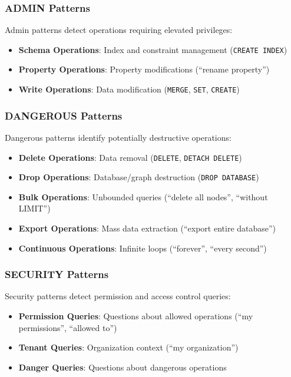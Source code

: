 \documentclass[a4paper,twoside]{sapthesis}
\begin{document}
\subsubsection{ADMIN Patterns}

Admin patterns detect operations requiring elevated privileges:

\begin{itemize}
    \item \textbf{Schema Operations}: Index and constraint management (\texttt{CREATE INDEX})
    \item \textbf{Property Operations}: Property modifications (``rename property'')
    \item \textbf{Write Operations}: Data modification (\texttt{MERGE}, \texttt{SET}, \texttt{CREATE})
\end{itemize}

\subsubsection{DANGEROUS Patterns}

Dangerous patterns identify potentially destructive operations:

\begin{itemize}
    \item \textbf{Delete Operations}: Data removal (\texttt{DELETE}, \texttt{DETACH DELETE})
    \item \textbf{Drop Operations}: Database/graph destruction (\texttt{DROP DATABASE})
    \item \textbf{Bulk Operations}: Unbounded queries (``delete all nodes'', ``without LIMIT'')
    \item \textbf{Export Operations}: Mass data extraction (``export entire database'')
    \item \textbf{Continuous Operations}: Infinite loops (``forever'', ``every second'')
\end{itemize}

\subsubsection{SECURITY Patterns}

Security patterns detect permission and access control queries:

\begin{itemize}
    \item \textbf{Permission Queries}: Questions about allowed operations (``my permissions'', ``allowed to'')
    \item \textbf{Tenant Queries}: Organization context (``my organization'')
    \item \textbf{Danger Queries}: Questions about dangerous operations
\end{itemize}
\end{document}
